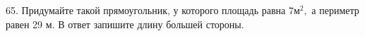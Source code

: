 65. Придумайте такой прямоугольник, у которого площадь равна $7\text{м}^2,$ а периметр равен 29 м. В ответ запишите длину большей стороны.\\
